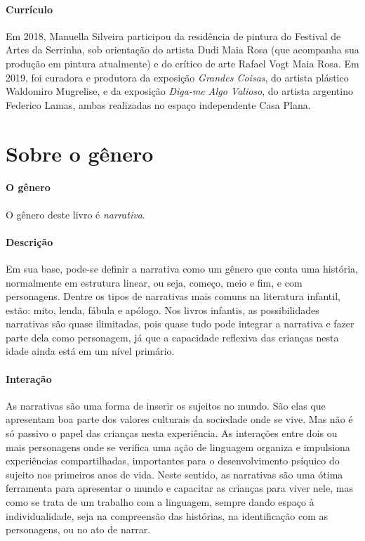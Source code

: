 \documentclass[11pt]{extarticle}
\begin{document}
\paragraph{Currículo} 
Em 2018, Manuella Silveira participou da residência de pintura do Festival de Artes da Serrinha, sob orientação do artista Dudi Maia Rosa (que acompanha sua produção em pintura atualmente) e do crítico de arte Rafael Vogt Maia Rosa. Em 2019, foi curadora e produtora da exposição \textit{Grandes Coisas}, do artista plástico Waldomiro Mugrelise, e da exposição \textit{Diga-me Algo Valioso}, do artista argentino Federico Lamas, ambas realizadas no espaço independente Casa Plana.


\section{Sobre o gênero}

\paragraph{O gênero} O gênero deste livro é \textit{narrativa}. 

\paragraph{Descrição} Em sua base, pode-se definir a narrativa como um gênero que conta uma história, normalmente em estrutura linear, ou seja, começo, meio e fim, e com personagens. 
Dentre os tipos de narrativas mais comuns na literatura infantil, estão: mito, lenda, 
fábula e apólogo. Nos livros infantis, as possibilidades narrativas são quase ilimitadas, pois quase tudo pode integrar a narrativa e fazer parte dela como personagem, já que a capacidade reflexiva das crianças nesta idade ainda está em um nível primário. 



\paragraph{Interação} As narrativas são uma forma de inserir os sujeitos no mundo. 
São elas que apresentam boa parte dos valores culturais da sociedade 
onde se vive. Mas não é só passivo o papel das crianças nesta experiência. 
As interações entre dois ou mais personagens onde se verifica
uma ação de linguagem organiza e impulsiona experiências compartilhadas,
importantes para o desenvolvimento psíquico do sujeito nos primeiros anos de vida.
Neste sentido, as narrativas são uma ótima ferramenta para
apresentar o mundo e capacitar as crianças para viver nele, mas como se
trata de um trabalho com a linguagem, sempre dando espaço à individualidade, 
seja na compreensão das histórias, na identificação com as personagens, ou 
no ato de narrar.
\end{document}
